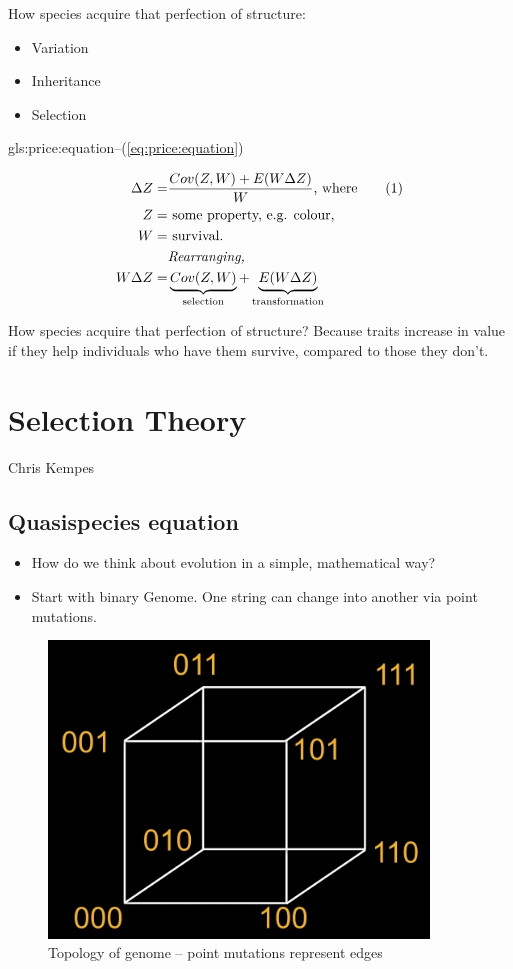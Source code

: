 \documentclass[]{article}
\newcommand\numberthis{\addtocounter{equation}{1}\tag{\theequation}}
\begin{document}
How species acquire that perfection of structure:
\begin{itemize}
	\item Variation
	\item Inheritance
	\item Selection
\end{itemize}

\gls{gls:price:equation}--(\ref{eq:price:equation})

\begin{align*}
\Delta Z =& \frac{Cov(Z,W) + E(W \Delta Z)}{W}\text{, where} \numberthis \label{eq:price:equation}\\
Z=& \text{ some property, e.g. colour,}\\
W=& \text{ survival.}\\
 & \textit{Rearranging, }\\
W \Delta Z =& \underbrace{Cov(Z,W)}_\text{selection} + \underbrace{E(W \Delta Z)}_\text{transformation}
\end{align*}

How species acquire that perfection of structure? Because traits increase in value if they help individuals who have them survive, compared to those they don't.

\section{Selection Theory}
Chris Kempes

\subsection{Quasispecies equation}
\begin{itemize}
	\item How do we think about evolution in a simple, mathematical way?
	\item Start with binary Genome. One string can change into another via point mutations.
\end{itemize}


\begin{figure}[H]
	\caption{Topology of genome -- point mutations represent edges}\label{fig:GenomeTopology} 
	\includegraphics[width=0.9\textwidth]{GenomeTopology}
\end{figure}
\end{document}

